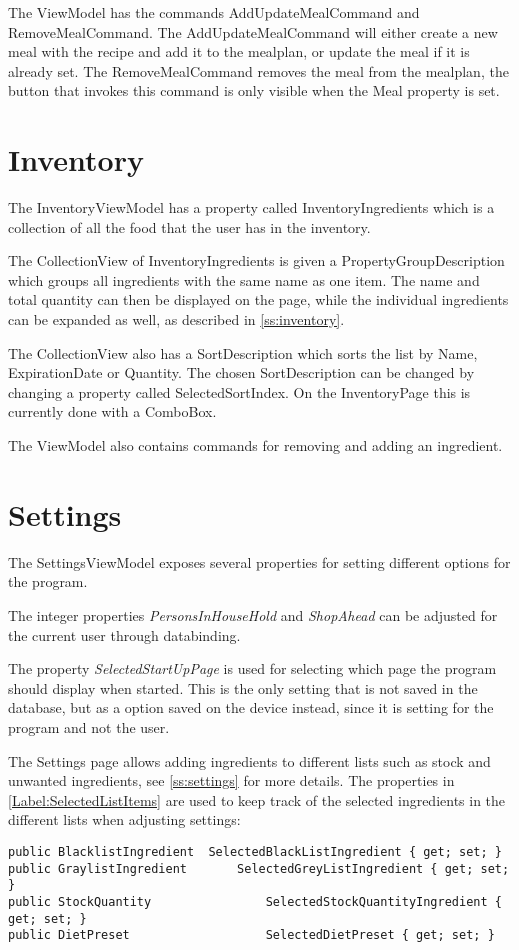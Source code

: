 The ViewModel has the commands AddUpdateMealCommand and RemoveMealCommand. The AddUpdateMealCommand will either create a new meal with the recipe and add it to the mealplan, or update the meal if it is already set.
The RemoveMealCommand removes the meal from the mealplan, the button that invokes this command is only visible when the Meal property is set.


\section{Inventory}
The InventoryViewModel has a property called InventoryIngredients which is a collection of all the food that the user has in the inventory.

The CollectionView of InventoryIngredients is given a PropertyGroupDescription which groups all ingredients with the same name as one item. The name and total quantity can then be displayed on the page, while the individual ingredients can be expanded as well, as described in \cref{ss:inventory}.

The CollectionView also has a SortDescription which sorts the list by Name, ExpirationDate or Quantity. The chosen SortDescription can be changed by changing a property called SelectedSortIndex. On the InventoryPage this is currently done with a ComboBox.

The ViewModel also contains commands for removing and adding an ingredient.

\section{Settings}
The SettingsViewModel exposes several properties for setting different options for the program.

The integer properties \textit{PersonsInHouseHold} and \textit{ShopAhead} can be adjusted for the current user through databinding.

The property \textit{SelectedStartUpPage} is used for selecting which page the program should display when started. This is the only setting that is not saved in the database, but as a option saved on the device instead, since it is setting for the program and not the user.

The Settings page allows adding ingredients to different lists such as stock and unwanted ingredients, see \cref{ss:settings} for more details.
The properties in \cref{Label:SelectedListItems} are used to keep track of the selected ingredients in the different lists when adjusting settings:
\begin{lstlisting}[caption=Selected list items, language=CSharp, label={Label:SelectedListItems}]
public BlacklistIngredient	SelectedBlackListIngredient { get; set; }
public GraylistIngredient		SelectedGreyListIngredient { get; set; }
public StockQuantity 				SelectedStockQuantityIngredient { get; set; }
public DietPreset 					SelectedDietPreset { get; set; }
\end{lstlisting}

